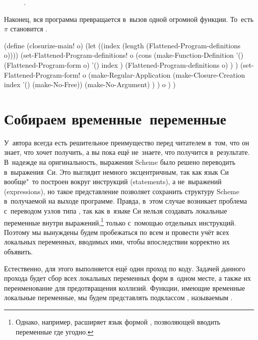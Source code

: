 \begin{figure}\centering

\caption{\protect{}.}%
\label{cc/collecting/pic:result}
\end{figure}

Наконец, вся программа превращается в~вызов одной огромной функции. То~есть
$\pi$ становится .

\begin{code:lisp}
(define (closurize-main! o)
  (let ((index (length (Flattened-Program-definitions o))))
    (set-Flattened-Program-definitions!
     o (cons (make-Function-Definition
              '() (Flattened-Program-form o) '() index )
             (Flattened-Program-definitions o) ) )
    (set-Flattened-Program-form!
     o (make-Regular-Application
        (make-Closure-Creation index '() (make-No-Free))
        (make-No-Argument) ) )
    o ) )
\end{code:lisp}


\section{Собираем временные~переменные}\label{cc/sect:tmp}

У~автора всегда есть решительное преимущество перед читателем в~том, что он
знает, что хочет получить, а вы пока ещё не~знаете, что получится в~результате.
В~надежде на оригинальность, выражения Scheme было решено переводить
в~выражения~Си. Это выглядит немного эксцентричным, так как язык Си вообще"~то
построен вокруг инструкций (statements), а не~выражений (expressions), но такое
представление позволяет сохранить структуру Scheme в~получаемой на выходе
программе. Правда, в~этом случае возникает проблема с~переводом узлов типа
, так как в~языке Си нельзя создавать локальные переменные внутри
выражений,\footnote*{Однако, например,  расширяет язык формой
, позволяющей вводить переменные где угодно.} только с~помощью
отдельных инструкций. Поэтому мы вынуждены будем пробежаться по всем
 и провести учёт всех локальных переменных, вводимых ими, чтобы
впоследствии корректно их объявить.

Естественно, для этого выполняется ещё один проход по коду. Задачей данного
прохода будет сбор всех локальных переменных форм  в~одном месте,
а также их переименование для предотвращения коллизий. Функции, имеющие
временные локальные переменные, мы будем представлять подклассом
, называемым .

